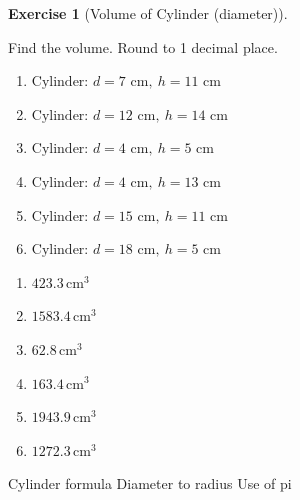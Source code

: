 \documentclass[
  letterpaper,
  DIV=11,
  numbers=noendperiod]{scrreprt}
\theoremstyle{definition}
\newtheorem{exercise}{Exercise}[chapter]
\theoremstyle{remark}
\begin{document}
\begin{exercise}[Volume of Cylinder
(diameter)]\protect\hypertarget{exr-vol-7}{}\label{exr-vol-7}

Find the volume. Round to 1 decimal place.

\begin{enumerate}
\def\labelenumi{\alph{enumi})}
\item
  \(\text{Cylinder: }d=7\text{ cm},\ h=11\text{ cm}\)
\item
  \(\text{Cylinder: }d=12\text{ cm},\ h=14\text{ cm}\)
\item
  \(\text{Cylinder: }d=4\text{ cm},\ h=5\text{ cm}\)
\item
  \(\text{Cylinder: }d=4\text{ cm},\ h=13\text{ cm}\)
\item
  \(\text{Cylinder: }d=15\text{ cm},\ h=11\text{ cm}\)
\item
  \(\text{Cylinder: }d=18\text{ cm},\ h=5\text{ cm}\)
\end{enumerate}

\begin{tcolorbox}[enhanced jigsaw, opacitybacktitle=0.6, coltitle=black, arc=.35mm, colframe=quarto-callout-tip-color-frame, colback=white, bottomrule=.15mm, left=2mm, colbacktitle=quarto-callout-tip-color!10!white, titlerule=0mm, opacityback=0, title=\textcolor{quarto-callout-tip-color}{\faLightbulb}\hspace{0.5em}{🔍 View Solution}, leftrule=.75mm, breakable, rightrule=.15mm, bottomtitle=1mm, toptitle=1mm, toprule=.15mm]

\begin{enumerate}
\def\labelenumi{\alph{enumi})}
\item
  \(423.3\,\text{cm}^{3}\)
\item
  \(1583.4\,\text{cm}^{3}\)
\item
  \(62.8\,\text{cm}^{3}\)
\item
  \(163.4\,\text{cm}^{3}\)
\item
  \(1943.9\,\text{cm}^{3}\)
\item
  \(1272.3\,\text{cm}^{3}\)
\end{enumerate}

\end{tcolorbox}

{Cylinder formula} {Diameter to radius} {Use of pi}

\end{exercise}
\end{document}
